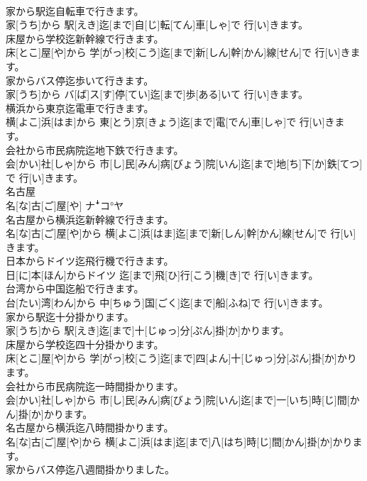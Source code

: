 \documentclass[8pt]{extreport}
\begin{document}
\begin{CJK}{UTF8}{min}
\\	家から駅迄自転車で行きます。	
\\	家[うち]から 駅[えき]迄[まで]自[じ]転[てん]車[しゃ]で 行[い]きます。
\\	床屋から学校迄新幹線で行きます。	
\\	床[とこ]屋[や]から 学[がっ]校[こう]迄[まで]新[しん]幹[かん]線[せん]で 行[い]きます。
\\	家からバス停迄歩いて行きます。	
\\	家[うち]から バ[ば]ス[す]停[てい]迄[まで]歩[ある]いて 行[い]きます。
\\	横浜から東京迄電車で行きます。	
\\	横[よこ]浜[はま]から 東[とう]京[きょう]迄[まで]電[でん]車[しゃ]で 行[い]きます。
\\	会社から市民病院迄地下鉄で行きます。	
\\	会[かい]社[しゃ]から 市[し]民[みん]病[びょう]院[いん]迄[まで]地[ち]下[か]鉄[てつ]で 行[い]きます。
\\	名古屋	
\\	名[な]古[ご]屋[や]	ナꜜコ°ヤ
\\	名古屋から横浜迄新幹線で行きます。	
\\	名[な]古[ご]屋[や]から 横[よこ]浜[はま]迄[まで]新[しん]幹[かん]線[せん]で 行[い]きます。
\\	日本からドイツ迄飛行機で行きます。	
\\	日[に]本[ほん]からドイツ 迄[まで]飛[ひ]行[こう]機[き]で 行[い]きます。
\\	台湾から中国迄船で行きます。	
\\	台[たい]湾[わん]から 中[ちゅう]国[ごく]迄[まで]船[ふね]で 行[い]きます。
\\	家から駅迄十分掛かります。	
\\	家[うち]から 駅[えき]迄[まで]十[じゅっ]分[ぷん]掛[か]かります。
\\	床屋から学校迄四十分掛かります。	
\\	床[とこ]屋[や]から 学[がっ]校[こう]迄[まで]四[よん]十[じゅっ]分[ぷん]掛[か]かります。
\\	会社から市民病院迄一時間掛かります。	
\\	会[かい]社[しゃ]から 市[し]民[みん]病[びょう]院[いん]迄[まで]一[いち]時[じ]間[かん]掛[か]かります。
\\	名古屋から横浜迄八時間掛かります。	
\\	名[な]古[ご]屋[や]から 横[よこ]浜[はま]迄[まで]八[はち]時[じ]間[かん]掛[か]かります。
\\	家からバス停迄八週間掛かりました。	

\end{CJK}
\end{document}

